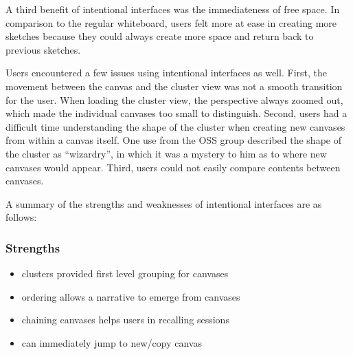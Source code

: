 A third benefit of intentional interfaces was the immediateness of free space. In comparison to the regular whiteboard, users felt more at ease in creating more sketches because they could always create more space and return back to previous sketches. 


Users encountered a few issues using intentional interfaces as well. First, the movement between the canvas and the cluster view was not a smooth transition for the user. When loading the cluster view, the perspective always zoomed out, which made the individual canvases too small to distinguish. Second, users had a difficult time understanding the shape of the cluster when creating new canvases from within a canvas itself. One use from the OSS group described the shape of the cluster as ``wizardry'', in which it was a mystery to him as to where new canvases would appear. Third, users could not easily compare contents between canvases.


A summary of the strengths and weaknesses of intentional interfaces are as follows:

\subsubsection{Strengths}

\begin{itemize}
	\item clusters provided first level grouping for canvases
	\item ordering allows a narrative to emerge from canvases
	\item chaining canvases helps users in recalling sessions
	\item can immediately jump to new/copy canvas
\end{itemize}

